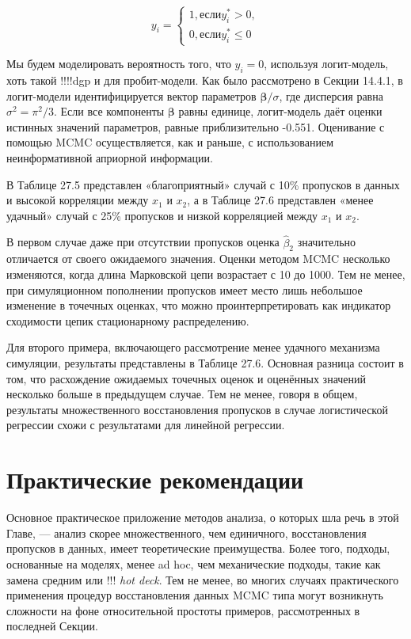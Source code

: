 \begin{equation}
y_i=
\begin{cases}
1, \text{если} y_i^*>0, \\
0, \text{если} y_i^*\leqslant 0
\end{cases}
\end{equation}



Мы будем моделировать вероятность того, что $y_i=0$, используя логит-модель, хоть такой !!!!dgp и для пробит-модели. Как было рассмотрено в Секции 14.4.1, в логит-модели идентифицируется вектор параметров $\mathbf{\beta}/\sigma$, где дисперсия равна $\sigma^2=\pi^2/3$. Если все компоненты $\mathbf{\beta}$ равны единице, логит-модель даёт оценки истинных значений параметров, равные приблизительно -0.551. Оценивание с помощью MCMC осуществляется, как и раньше, с использованием неинформативной априорной информации.

В Таблице 27.5 представлен «благоприятный» случай с 10\% пропусков в данных и высокой корреляции между $x_1$ и $x_2$, а в Таблице 27.6 представлен «менее удачный» случай с 25\% пропусков и низкой корреляцией между $x_1$ и $x_2$.

В первом случае даже при отсутствии пропусков оценка $\widehat{\beta}_2$ значительно отличается от своего ожидаемого значения. Оценки методом MCMC несколько изменяются, когда длина Марковской цепи возрастает с 10 до 1000. Тем не менее, при симуляционном пополнении пропусков имеет место лишь небольшое изменение в точечных оценках, что можно проинтерпретировать как индикатор сходимости цепик стационарному распределению.

Для второго примера, включающего рассмотрение менее удачного механизма симуляции, результаты представлены в Таблице 27.6. Основная разница состоит в том, что расхождение ожидаемых точечных оценок и оценённых значений несколько больше в предыдущем случае. Тем не менее, говоря в общем, результаты множественного восстановления пропусков в случае логистической регрессии схожи с результатами для линейной регрессии.



\section{Практические рекомендации}

Основное практическое приложение методов анализа, о которых шла речь в этой Главе, --- анализ скорее множественного, чем единичного, восстановления пропусков в данных, имеет теоретические преимущества. Более того, подходы, основанные на моделях, менее ad hoc, чем механические подходы, такие как замена средним или !!! \emph{hot deck}. Тем не менее, во многих случаях практического применения процедур восстановления данных MCMC типа могут возникнуть сложности на фоне относительной простоты примеров, рассмотренных в последней Секции.

